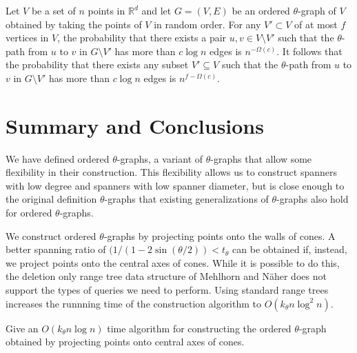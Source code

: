 \documentclass{elsart}
\begin{document}
\begin{thm}
Let $V$ be a set of $n$ points in $\mathbb{R}^d$ and let $G=(V,E)$ be
an ordered $\theta$-graph of $V$ obtained by taking the points of $V$
in random order.  For any $V'\subset V$ of at most $f$ vertices in
$V$, the probability that there exists a pair $u,v\in V\setminus V'$
such that the $\theta$-path from $u$ to $v$ in $G\setminus V'$ has
more than $c\log n$ edges is $n^{-\Omega(c)}$.  It follows that the
probability that there exists any subset $V'\subseteq V$ such that the
$\theta$-path from $u$ to $v$ in $G\setminus V'$ has more than $c\log
n$ edges is $n^{f-\Omega(c)}$.
\end{thm}



\section{Summary and Conclusions}

We have defined ordered $\theta$-graphs, a variant of $\theta$-graphs
that allow some flexibility in their construction.  This flexibility
allows us to construct spanners with low degree and spanners with low
spanner diameter, but is close enough to the original definition
$\theta$-graphs that existing generalizations of $\theta$-graphs also
hold for ordered $\theta$-graphs.

We construct ordered $\theta$-graphs by projecting points onto the
walls of cones.  A better spanning ratio of
$(1/(1-2\sin(\theta/2))<t_\theta$ can be obtained if, instead, we
project points onto the central axes of cones.  While it is possible
to do this, the deletion only range tree data structure of Mehlhorn
and N\"aher does not support the types of queries we need to perform.
Using standard range trees increases the runnning time of the
construction algorithm to $O(k_\theta n\log^2 n)$.

\begin{op}
Give an $O(k_\theta n\log n)$ time algorithm for constructing the
ordered $\theta$-graph obtained by projecting points onto central axes
of cones.
\end{op}
\end{document}
